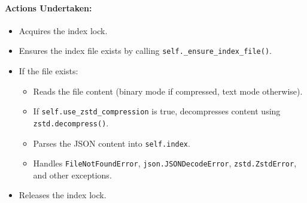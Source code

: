 \documentclass{article}
\begin{document}
\paragraph{Actions Undertaken:}
\begin{itemize}
    \item Acquires the index lock.
    \item Ensures the index file exists by calling \texttt{self.\_ensure\_index\_file()}.
    \item If the file exists:
        \begin{itemize}
            \item Reads the file content (binary mode if compressed, text mode otherwise).
            \item If \texttt{self.use\_zstd\_compression} is true, decompresses content using \texttt{zstd.decompress()}.
            \item Parses the JSON content into \texttt{self.index}.
            \item Handles \texttt{FileNotFoundError}, \texttt{json.JSONDecodeError}, \texttt{zstd.ZstdError}, and other exceptions.
        \end{itemize}
    \item Releases the index lock.
\end{itemize}
\end{document}
